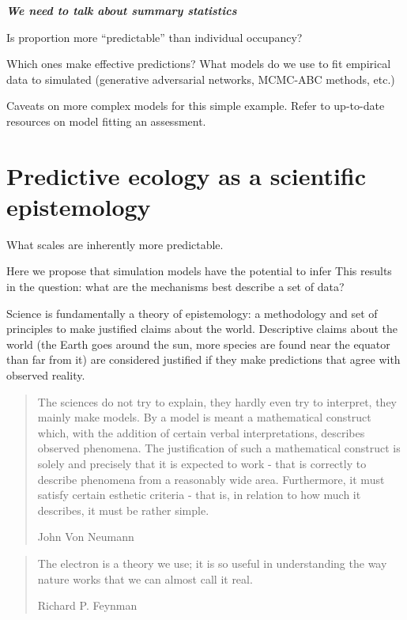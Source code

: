 \documentclass[10pt,oneside]{article}
\begin{document}
\textbf{\emph{We need to talk about summary statistics}}

Is proportion more ``predictable'' than individual occupancy?

Which ones make effective predictions? What models do we use to fit
empirical data to simulated (generative adversarial networks, MCMC-ABC
methods, etc.)

Caveats on more complex models for this simple example. Refer to
up-to-date resources on model fitting an assessment.

\hypertarget{predictive-ecology-as-a-scientific-epistemology}{%
\section{Predictive ecology as a scientific
epistemology}\label{predictive-ecology-as-a-scientific-epistemology}}

What scales are inherently more predictable.

Here we propose that simulation models have the potential to infer This
results in the question: what are the mechanisms best describe a set of
data?

Science is fundamentally a theory of epistemology: a methodology and set
of principles to make justified claims about the world. Descriptive
claims about the world (the Earth goes around the sun, more species are
found near the equator than far from it) are considered justified if
they make predictions that agree with observed reality.

\begin{quote}
The sciences do not try to explain, they hardly even try to interpret,
they mainly make models. By a model is meant a mathematical construct
which, with the addition of certain verbal interpretations, describes
observed phenomena. The justification of such a mathematical construct
is solely and precisely that it is expected to work - that is correctly
to describe phenomena from a reasonably wide area. Furthermore, it must
satisfy certain esthetic criteria - that is, in relation to how much it
describes, it must be rather simple.

John Von Neumann
\end{quote}

\begin{quote}
The electron is a theory we use; it is so useful in understanding the
way nature works that we can almost call it real.

Richard P. Feynman
\end{quote}
\end{document}
